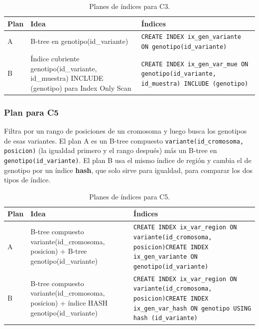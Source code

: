 \begin{table}[H]
\centering\footnotesize
\begin{tabular}{@{}>{\raggedright\arraybackslash}p{0.8cm}>{\raggedright\arraybackslash}p{3.9cm}>{\raggedright\arraybackslash}p{9.4cm}@{}}
\toprule
Plan & Idea & Índices \\
\midrule
A & B-tree en genotipo(id\_variante) & \texttt{CREATE INDEX ix\_\allowbreak{}gen\_\allowbreak{}variante ON genotipo(id\_\allowbreak{}variante)} \\
B & Índice cubriente genotipo(id\_variante, id\_muestra) INCLUDE (genotipo) para Index Only Scan & \texttt{CREATE INDEX ix\_\allowbreak{}gen\_\allowbreak{}var\_\allowbreak{}mue ON genotipo(id\_\allowbreak{}variante, id\_\allowbreak{}muestra) INCLUDE (genotipo)} \\
\bottomrule
\end{tabular}
\caption{Planes de índices para C3.}
\end{table}
\subsubsection{Plan para C5}

Filtra por un rango de posiciones de un cromosoma y luego busca los genotipos de esas variantes. El plan A es un B-tree compuesto \texttt{variante(id\_\allowbreak{}cromosoma, posicion)} (la igualdad primero y el rango después) más un B-tree en \texttt{genotipo(id\_\allowbreak{}variante)}. El plan B usa el mismo índice de región y cambia el de genotipo por un índice \textbf{hash}, que solo sirve para igualdad, para comparar los dos tipos de índice.

\begin{table}[H]
\centering\footnotesize
\begin{tabular}{@{}>{\raggedright\arraybackslash}p{0.8cm}>{\raggedright\arraybackslash}p{3.9cm}>{\raggedright\arraybackslash}p{9.4cm}@{}}
\toprule
Plan & Idea & Índices \\
\midrule
A & B-tree compuesto variante(id\_cromosoma, posicion) + B-tree genotipo(id\_variante) & \texttt{CREATE INDEX ix\_\allowbreak{}var\_\allowbreak{}region ON variante(id\_\allowbreak{}cromosoma, posicion)}\newline \texttt{CREATE INDEX ix\_\allowbreak{}gen\_\allowbreak{}variante ON genotipo(id\_\allowbreak{}variante)} \\
B & B-tree compuesto variante(id\_cromosoma, posicion) + índice HASH genotipo(id\_variante) & \texttt{CREATE INDEX ix\_\allowbreak{}var\_\allowbreak{}region ON variante(id\_\allowbreak{}cromosoma, posicion)}\newline \texttt{CREATE INDEX ix\_\allowbreak{}gen\_\allowbreak{}var\_\allowbreak{}hash ON genotipo USING hash (id\_\allowbreak{}variante)} \\
\bottomrule
\end{tabular}
\caption{Planes de índices para C5.}
\end{table}
